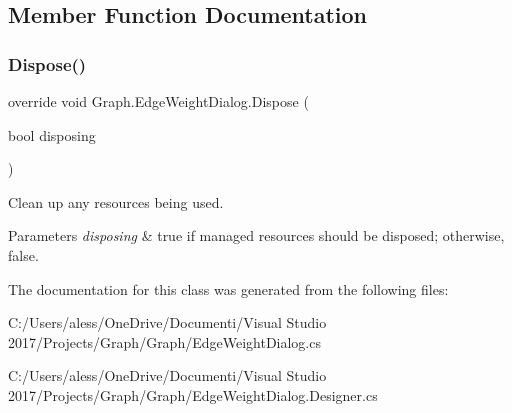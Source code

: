 \subsection{Member Function Documentation}
\mbox{\label{class_graph_1_1_edge_weight_dialog_a861196924b6ecb2c9203005c4b73e27c}} 
\subsubsection{\texorpdfstring{Dispose()}{Dispose()}}
{\footnotesize\ttfamily override void Graph.\+Edge\+Weight\+Dialog.\+Dispose (\begin{DoxyParamCaption}\item[{bool}]{disposing }\end{DoxyParamCaption})\hspace{0.3cm}{\ttfamily [protected]}}



Clean up any resources being used. 


\begin{DoxyParams}{Parameters}
{\em disposing} & true if managed resources should be disposed; otherwise, false.\\
\hline
\end{DoxyParams}


The documentation for this class was generated from the following files\+:\begin{DoxyCompactItemize}
\item 
C\+:/\+Users/aless/\+One\+Drive/\+Documenti/\+Visual Studio 2017/\+Projects/\+Graph/\+Graph/Edge\+Weight\+Dialog.\+cs\item 
C\+:/\+Users/aless/\+One\+Drive/\+Documenti/\+Visual Studio 2017/\+Projects/\+Graph/\+Graph/Edge\+Weight\+Dialog.\+Designer.\+cs\end{DoxyCompactItemize}

